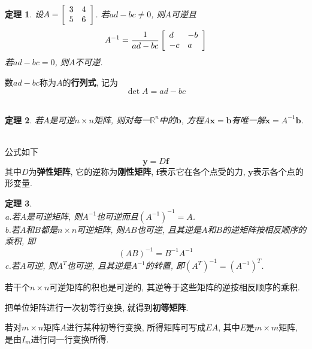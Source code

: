 \documentclass[UTF8,fontset=ubuntu]{ctexart}
\theoremstyle{plain}
\newtheorem{theorem}{定理}
\theoremstyle{nonumberplain}
\theoremstyle{empty}
\begin{document}
\begin{theorem}
设$A=\left[\begin{array}{r r}3 & 4\\5 & 6\end{array}\right]$. 若$ad-bc\neq 0$, 则$A$可逆且
\[A^{-1}=\frac{1}{ad-bc}\left[\begin{array}{l l}d & -b\\-c & a\end{array}\right]\]
若$ad-bc=0$, 则$A$不可逆.
\end{theorem}\vspace{4ex}

数$ad-bc$称为$A$的\textbf{行列式}, 记为
\[\det A=ad-bc\]\\

\begin{theorem}
若$A$是可逆$n\times n$矩阵, 则对每一$\mathbb{R}^n$中的$\bm{b}$, 方程$A\bm{x}=\bm{b}$有唯一解$\bm{x}=A^{-1}\bm{b}$.
\end{theorem}\vspace{4ex}

\begin{law}[胡克定律]\ \\
公式如下
\[\bm{y}=D\bm{f}\]
其中$D$为\textbf{弹性矩阵}, 它的逆称为\textbf{刚性矩阵}, $\bm{f}$表示它在各个点受的力, $\bm{y}$表示各个点的形变量.
\end{law}\vspace{4ex}

\begin{theorem}\ \\
a.若$A$是可逆矩阵, 则$A^{-1}$也可逆而且$(A^{-1})^{-1}=A$.\\
b.若$A$和$B$都是$n\times n$可逆矩阵, 则$AB$也可逆, 且其逆是$A$和$B$的逆矩阵按相反顺序的乘积, 即
\[(AB)^{-1}=B^{-1}A^{-1}\]
c.若$A$可逆, 则$A^T$也可逆, 且其逆是$A^{-1}$的转置, 即$(A^T)^{-1}=(A^{-1})^T$.
\end{theorem}\vspace{4ex}

\begin{law}
若干个$n\times n$可逆矩阵的积也是可逆的, 其逆等于这些矩阵的逆按相反顺序的乘积.
\end{law}\vspace{4ex}

把单位矩阵进行一次初等行变换, 就得到\textbf{初等矩阵}.\\[2ex]

\begin{law}
若对$m\times n$矩阵$A$进行某种初等行变换, 所得矩阵可写成$EA$, 其中$E$是$m\times m$矩阵, 是由$I_m$进行同一行变换所得.
\end{law}\vspace{4ex}
\end{document}
